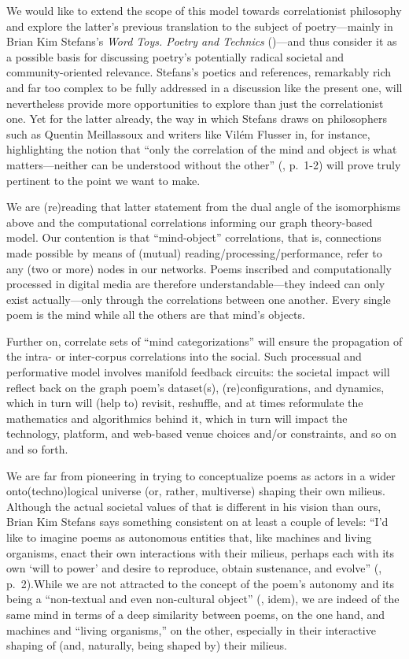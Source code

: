 We would like to extend the scope of this model towards correlationist
philosophy and explore the latter's previous translation to the subject
of poetry---mainly in Brian Kim Stefans's \emph{Word Toys. Poetry and
Technics} (\cite{stefans2017word})---and thus consider it as a possible
basis for discussing poetry's potentially radical societal and
community-oriented relevance. Stefans's poetics and references,
remarkably rich and far too complex to be fully addressed in a
discussion like the present one, will nevertheless provide more
opportunities to explore than just the correlationist one. Yet for the
latter already, the way in which Stefans draws on philosophers such as
Quentin Meillassoux and writers like Vilém Flusser in, for instance,
highlighting the notion that ``only the correlation of the mind and
object is what matters---neither can be understood without the other''
(\cite{stefans2017word}, p.~1-2) will prove truly pertinent to the point
we want to make.

We are (re)reading that latter statement from the dual angle of the
isomorphisms above and the computational correlations informing our
graph theory-based model. Our contention is that ``mind-object''
correlations, that is, connections made possible by means of (mutual)
reading/processing/performance, refer to any (two or more) nodes in our
networks. Poems inscribed and computationally processed in digital media
are therefore understandable---they indeed can only exist
actually---only through the correlations between one another. Every
single poem is the mind while all the others are that mind's objects.

Further on, correlate sets of ``mind categorizations'' will ensure the
propagation of the intra- or inter-corpus correlations into the social.
Such processual and performative model involves manifold feedback
circuits: the societal impact will reflect back on the graph poem's
dataset(s), (re)configurations, and dynamics, which in turn will (help
to) revisit, reshuffle, and at times reformulate the mathematics and
algorithmics behind it, which in turn will impact the technology,
platform, and web-based venue choices and/or constraints, and so on and
so forth.

We are far from pioneering in trying to conceptualize poems as actors in
a wider onto(techno)logical universe (or, rather, multiverse) shaping
their own milieus. Although the actual societal values of that is
different in his vision than ours, Brian Kim Stefans says something
consistent on at least a couple of levels: ``I'd like to imagine poems
as autonomous entities that, like machines and living organisms, enact
their own interactions with their milieus, perhaps each with its own
`will to power' and desire to reproduce, obtain sustenance, and evolve''
(\cite{stefans2017word}, p.~2).While we are not attracted to the concept
of the poem's autonomy and its being a ``non-textual and even
non-cultural object'' (\cite{stefans2017word}, idem), we are indeed of
the same mind in terms of a deep similarity between poems, on the one
hand, and machines and ``living organisms,'' on the other, especially in
their interactive shaping of (and, naturally, being shaped by) their
milieus.

